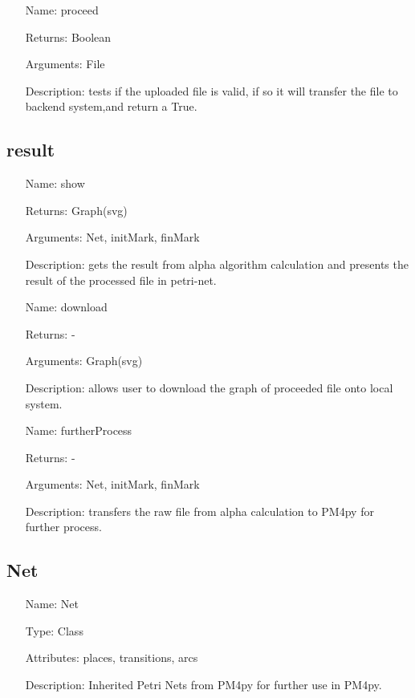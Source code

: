 \documentclass[runningheads]{llncs}
\begin{document}
\begin{itemize}
	\item[Name:] proceed
	\item[Returns:] Boolean
	\item[Arguments:] File
	\item[Description:] tests if the uploaded file is valid, if so it will transfer the file to backend system,and return a True.
\end{itemize}

\subsection{result}
\begin{itemize}
	\item[Name:] show
	\item[Returns:] Graph(svg)
	\item[Arguments:] Net, initMark, finMark
	\item[Description:] gets the result from alpha algorithm calculation and presents the result of the processed file in petri-net.
\end{itemize}

\begin{itemize}
	\item[Name:] download
	\item[Returns:] -
	\item[Arguments:] Graph(svg)
	\item[Description:] allows user to download the graph of proceeded file onto local system.
\end{itemize}

\begin{itemize}
	\item[Name:] furtherProcess
	\item[Returns:] -
	\item[Arguments:] Net, initMark, finMark
	\item[Description:] transfers the raw file from alpha calculation to PM4py for further process.
\end{itemize}

\subsection{Net}
\begin{itemize}
	\item[Name:] Net
	\item[Type:] Class
	\item[Attributes:] places, transitions, arcs
	\item[Description:] Inherited Petri Nets from PM4py for further use in PM4py.
\end{itemize}
\end{document}
